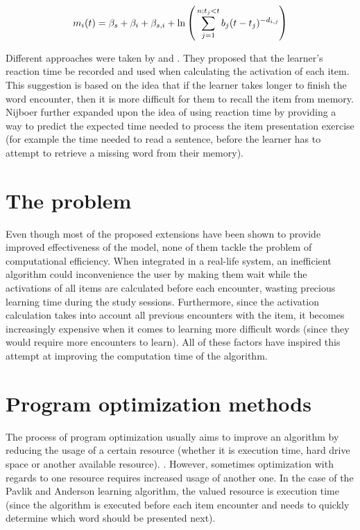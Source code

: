 \documentclass[a4paper]{report}
\begin{document}
\begin{equation}
\begin{large}
\label{eq:activation_ex}
m_i(t) = \beta_s + \beta_i + \beta_{s,i} + \ln{\Bigg(\sum_{j=1}^{n;t_j<t}{b_j(t - t_j)^{-d_{i,j}}}\Bigg)}
\end{large}
\end{equation}

Different approaches were taken by \cite{vans09} and \cite{nijboer11}. They proposed that the learner's reaction time be recorded and used when calculating the activation of each item. This suggestion is based on the idea that if the learner takes longer to finish the word encounter, then it is more difficult for them to recall the item from memory. Nijboer further expanded upon the idea of using reaction time by providing a way to predict the expected time needed to process the item presentation exercise (for example the time needed to read a sentence, before the learner has to attempt to retrieve a missing word from their memory).

\section{The problem}
Even though most of the proposed extensions have been shown to provide improved effectiveness of the model, none of them tackle the problem of computational efficiency. When integrated in a real-life system, an inefficient algorithm could inconvenience the user by making them wait while the activations of all items are calculated before each encounter, wasting precious learning time during the study sessions. Furthermore, since the activation calculation takes into account all previous encounters with the item, it becomes increasingly expensive when it comes to learning more difficult words (since they would require more encounters to learn). All of these factors have inspired this attempt at improving the computation time of the algorithm.

\section{Program optimization methods}
The process of program optimization usually aims to improve an algorithm by reducing the usage of a certain resource (whether it is execution time, hard drive space or another available resource). \citep{sedgewick11}. However, sometimes optimization with regards to one resource requires increased usage of another one. In the case of the Pavlik and Anderson learning algorithm, the valued resource is execution time (since the algorithm is executed before each item encounter and needs to quickly determine which word should be presented next).
\end{document}
